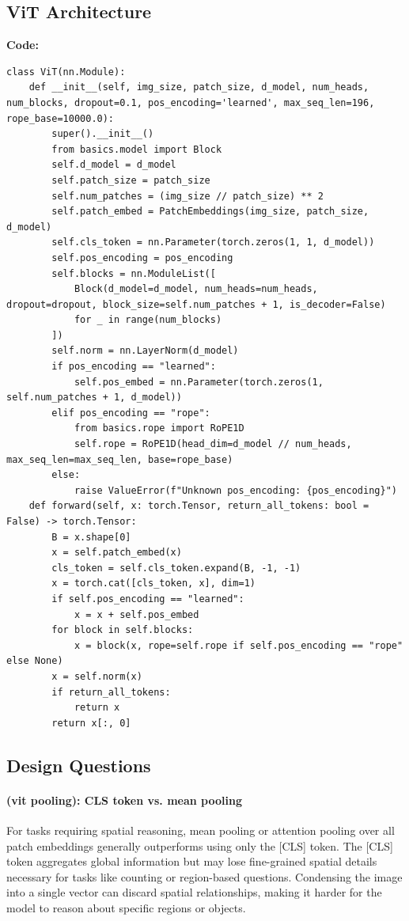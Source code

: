 \documentclass{article}
\begin{document}
\subsection{ViT Architecture}
\textbf{Code:}
\begin{verbatim}
class ViT(nn.Module):
    def __init__(self, img_size, patch_size, d_model, num_heads, num_blocks, dropout=0.1, pos_encoding='learned', max_seq_len=196, rope_base=10000.0):
        super().__init__()
        from basics.model import Block
        self.d_model = d_model
        self.patch_size = patch_size
        self.num_patches = (img_size // patch_size) ** 2
        self.patch_embed = PatchEmbeddings(img_size, patch_size, d_model)
        self.cls_token = nn.Parameter(torch.zeros(1, 1, d_model))
        self.pos_encoding = pos_encoding
        self.blocks = nn.ModuleList([
            Block(d_model=d_model, num_heads=num_heads, dropout=dropout, block_size=self.num_patches + 1, is_decoder=False)
            for _ in range(num_blocks)
        ])
        self.norm = nn.LayerNorm(d_model)
        if pos_encoding == "learned":
            self.pos_embed = nn.Parameter(torch.zeros(1, self.num_patches + 1, d_model))
        elif pos_encoding == "rope":
            from basics.rope import RoPE1D
            self.rope = RoPE1D(head_dim=d_model // num_heads, max_seq_len=max_seq_len, base=rope_base)
        else:
            raise ValueError(f"Unknown pos_encoding: {pos_encoding}")
    def forward(self, x: torch.Tensor, return_all_tokens: bool = False) -> torch.Tensor:
        B = x.shape[0]
        x = self.patch_embed(x)
        cls_token = self.cls_token.expand(B, -1, -1)
        x = torch.cat([cls_token, x], dim=1)
        if self.pos_encoding == "learned":
            x = x + self.pos_embed
        for block in self.blocks:
            x = block(x, rope=self.rope if self.pos_encoding == "rope" else None)
        x = self.norm(x)
        if return_all_tokens:
            return x
        return x[:, 0]
\end{verbatim}

\subsection{Design Questions}
\paragraph{(vit pooling): CLS token vs. mean pooling}
For tasks requiring spatial reasoning, mean pooling or attention pooling over all patch embeddings generally outperforms using only the [CLS] token. The [CLS] token aggregates global information but may lose fine-grained spatial details necessary for tasks like counting or region-based questions. Condensing the image into a single vector can discard spatial relationships, making it harder for the model to reason about specific regions or objects.
\end{document}
